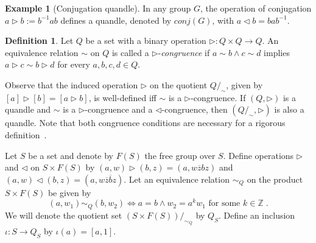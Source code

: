 \documentclass[a4paper,12pt]{amsart}
\numberwithin{equation}{section}
\theoremstyle{plain}
\theoremstyle{definition}
\newtheorem{definition}[theorem]{Definition}
\newtheorem{example}[theorem]{Example}
\newcommand{\ZZ}{\mathbb{Z}}
\newcommand{\tr}{\triangleright}
\newcommand{\tl}{\triangleleft}
\begin{document}
\begin{example}[Conjugation quandle]
	In any group $G$, the operation of conjugation $a\tr b:=b^{-1}ab$ defines a quandle, denoted by $conj(G)$, with
	$a \tl b = b a b^{-1}$.
\end{example}


\begin{definition} 
	Let $Q$ be a set with a binary operation $\tr \colon Q\times Q\to Q$. 
	An equivalence relation $\sim $ on $Q$ is called a $\tr $-\textit{congruence} if $a\sim b\land c\sim d$ implies $a\tr c\sim b\tr d$ for every $a,b,c,d\in Q$. 
\end{definition}
Observe that the induced operation $\tr $ on the quotient $Q/_{\sim }$, given by $[a]\tr [b]=[a\tr b]$, is well-defined iff $\sim $ is a $\tr $-congruence. 
If $(Q,\tr )$ is a quandle and $\sim $ is a $\tr $-congruence and a $\tl $-congruence, then $(Q/_{\sim },\tr )$ is also a quandle.
Note that both congruence conditions are necessary for a rigorous definition~\cite{BT}.




Let $S$ be a set and denote by $F(S)$ the free group over $S$. 
Define operations $\tr$ and $\tl$ on $S \times F(S)$ by $(a,w) \tr (b,z) = (a,w\overline{z}bz)$
and $(a,w) \tl (b,z) = (a,w\overline{z}\overline{b}z)$.
Let an equivalence relation $\sim _{Q}$ on the product $S\times F(S)$ be given by 
$$(a,w_1)\sim _{Q}(b,w_2) \Leftrightarrow a=b\land w_{2}=a^{k}w_1\textrm{ for some }k\in \ZZ \;.$$  
We will denote the quotient set $(S\times F(S))/_{\sim _{Q}}$ by $Q_S$. 
Define an inclusion $\iota \colon S\to Q_{S}$ by $\iota (a)=[a,1]$. 
\end{document}
